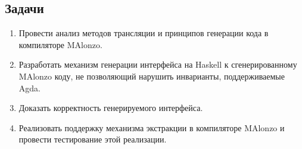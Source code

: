 \subsection{Задачи}

\begin{enumerate}
\item Провести анализ методов трансляции и принципов генерации кода в компиляторе MAlonzo.
\item Разработать механизм генерации интерфейса на Haskell к сгенерированному
      MAlonzo коду, не позволяющий нарушить инварианты, поддерживаемые Agda.
\item Доказать корректность генерируемого интерфейса.
\item Реализовать поддержку механизма экстракции в компиляторе MAlonzo и провести тестирование этой
      реализации.
\end{enumerate}
